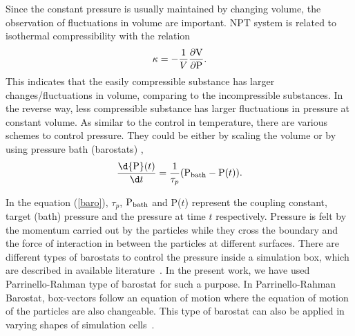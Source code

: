 Since the constant pressure is usually maintained by changing volume, the observation of fluctuations in volume are important. NPT system is related to isothermal compressibility with the relation
\begin{equation}
\kappa  = - \frac{1}{V} \frac{{\partial}{\rm V}}{{\partial} {\rm P}} .
\end{equation}
This indicates that the easily compressible substance has larger changes/fluctuations in volume, comparing to the incompressible substances. In the reverse way, less compressible substance has larger fluctuations in pressure at constant volume. As similar to the control in temperature, there are various schemes to control pressure. They could be either by scaling the volume or by using pressure bath (barostats) \citep{Gromacs-manual}, 
\begin{equation}
\frac{\d{\rm P}(t)}{\d t}  =  \frac{1}{\tau_p} ( {\rm P}_{\rm bath} - {\rm P}(t)). 
\label{baro}
\end{equation}
\begin{sloppypar}
In the equation (\ref{baro}), $\tau _p$, ${\rm P}_{\rm bath}$ and P($t$) represent the coupling constant, target (bath) pressure and the pressure at time $t$ respectively. Pressure is felt by the momentum carried out by the particles while they cross the boundary and the force of interaction in between the particles at different surfaces. There are different types of barostats to control the pressure inside a simulation box, which are described in available literature~\citep{Parrinello1981, Melchionna1993, Andersen1980}. In the present work, 
we have used Parrinello-Rahman type of barostat for such a purpose. In Parrinello-Rahman Barostat, box-vectors follow an equation of motion where the equation of motion of the particles are also changeable. This type of barostat can also be applied in varying shapes of simulation cells~\citep{Parrinello1981}.
\end{sloppypar}
